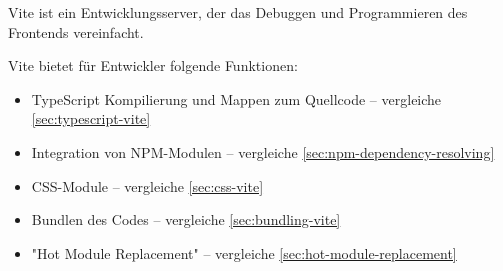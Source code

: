 

Vite ist ein Entwicklungsserver, der das Debuggen und Programmieren des Frontends vereinfacht. \cite{ViteOverview}

Vite bietet für Entwickler folgende Funktionen:

\begin{itemize}
    \item TypeScript Kompilierung und Mappen zum Quellcode -- vergleiche \ref{sec:typescript-vite}
    \item Integration von NPM-Modulen -- vergleiche \ref{sec:npm-dependency-resolving}
    \item CSS-Module -- vergleiche \ref{sec:css-vite}
    \item Bundlen des Codes -- vergleiche \ref{sec:bundling-vite}
    \item "Hot Module Replacement" -- vergleiche \ref{sec:hot-module-replacement}
\end{itemize}



